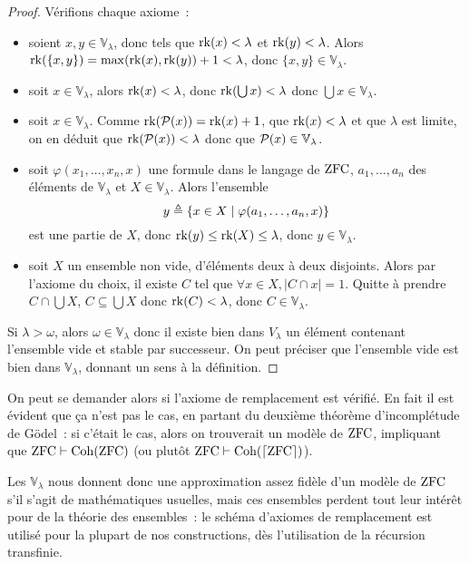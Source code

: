 \begin{proof}
  Vérifions chaque axiome~:
  \begin{itemize}
  \item soient $x,y\in \mathbb V_\lambda$, donc tels que $\operatorname{rk}(x) <\lambda$ et
    $\operatorname{rk}(y)<\lambda$. Alors $\operatorname{rk}(\{x,y\}) = \max(\operatorname{rk}(x),\operatorname{rk}(y)) + 1 < \lambda$,
    donc $\{x,y\}\in\mathbb V_\lambda$.
  \item soit $x\in \mathbb V_\lambda$, alors $\operatorname{rk}(x) < \lambda$, donc
    $\operatorname{rk}(\bigcup x) < \lambda$ donc $\bigcup x \in \mathbb V_\lambda$.
  \item soit $x\in \mathbb V_\lambda$. Comme $\operatorname{rk}(\mathcal{P}(x)) = \operatorname{rk}(x) + 1$,
    que $\operatorname{rk}(x) < \lambda$ et que $\lambda$ est limite, on en déduit que
    $\operatorname{rk}(\mathcal{P}(x)) < \lambda$ donc que $\mathcal{P}(x) \in \mathbb V_\lambda$.
  \item soit $\varphi(x_1,\ldots,x_n,x)$ une formule dans le langage de
    $\operatorname{ZFC}$, $a_1,\ldots,a_n$ des éléments de $\mathbb V_\lambda$ et
    $X\in \mathbb V_\lambda$. Alors l'ensemble
    \[y \triangleq \{x \in X \mid \varphi(a_1,\ldots,a_n,x)\}\]
    est une partie de $X$, donc $\operatorname{rk}(y)\leq \operatorname{rk}(X) \leq \lambda$, donc
    $y\in \mathbb V_\lambda$.
  \item soit $X$ un ensemble non vide, d'éléments deux à deux disjoints. Alors
    par l'axiome du choix, il existe $C$ tel que $\forall x \in X,|C\cap x|=1$.
    Quitte à prendre $C \cap \bigcup X$, $C\subseteq \bigcup X$ donc
    $\operatorname{rk}(C) < \lambda$, donc $C\in \mathbb V_\lambda$.
  \end{itemize}

  Si $\lambda > \omega$, alors $\omega \in \mathbb V_\lambda$ donc il existe
  bien dans $V_\lambda$ un élément contenant l'ensemble vide et stable par
  successeur. On peut préciser que l'ensemble vide est bien dans
  $\mathbb V_\lambda$, donnant un sens à la définition.
\end{proof}

On peut se demander alors si l'axiome de remplacement est vérifié. En fait il
est évident que ça n'est pas le cas, en partant du deuxième théorème
d'incomplétude de Gödel~: si c'était le cas, alors on trouverait un modèle de
$\operatorname{ZFC}$, impliquant que $\operatorname{ZFC}\vdash \operatorname{Coh}(\operatorname{ZFC})$ (ou plutôt
$\operatorname{ZFC}\vdash \operatorname{Coh}(\lceil \operatorname{ZFC}\rceil)$).

Les $\mathbb V_\lambda$ nous donnent donc une approximation assez fidèle d'un
modèle de $\operatorname{ZFC}$ s'il s'agit de mathématiques usuelles, mais ces ensembles
perdent tout leur intérêt pour de la théorie des ensembles~: le schéma d'axiomes
de remplacement est utilisé pour la plupart de nos constructions, dès
l'utilisation de la récursion transfinie.

